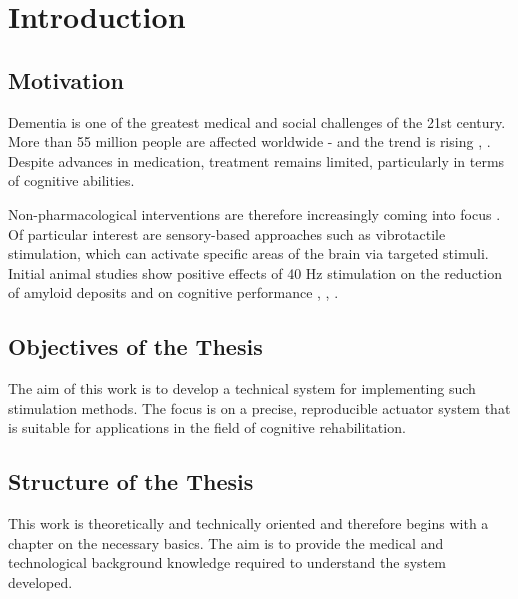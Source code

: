\chapter[Introduction]{Introduction}

\section{Motivation}
Dementia is one of the greatest medical and social challenges of the 21st century. More than 55 million people are affected worldwide - and the trend is rising \cite{Association.2025}, \cite{WorldHealthOrganization.2021}. Despite advances in medication, treatment remains limited, particularly in terms of cognitive abilities.

Non-pharmacological interventions are therefore increasingly coming into focus \cite{Zucchella.2018}. Of particular interest are sensory-based approaches such as vibrotactile stimulation, which can activate specific areas of the brain via targeted stimuli. Initial animal studies show positive effects of 40 Hz stimulation on the reduction of amyloid deposits and on cognitive performance \cite{Mably.2018}, \cite{Iaccarino.2016}, \cite{Martorell.2019}.

\section{Objectives of the Thesis}
The aim of this work is to develop a technical system for implementing such stimulation methods. The focus is on a precise, reproducible actuator system that is suitable for applications in the field of cognitive rehabilitation.

\section{Structure of the Thesis}
This work is theoretically and technically oriented and therefore begins with a chapter on the necessary basics. The aim is to provide the medical and technological background knowledge required to understand the system developed.
